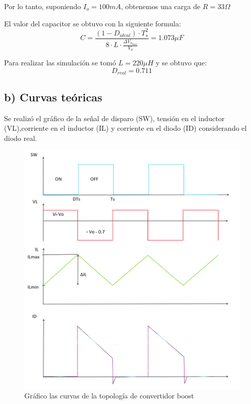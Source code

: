 \documentclass[e4_tp1_main.tex]{subfiles}
\begin{document}


Por lo tanto, suponiendo $I_o=100mA$, obtenemos una carga de $R=33\Omega$



El valor del capacitor se obtuvo con la siguiente formula:
$$C=\frac{(1-D_{ideal}) \cdot T_{s}^{2}}{8\cdot L\cdot \frac{\Delta V_{o_{max}}}{V_o}}=1.073\mu F$$

Para realizar las simulaci\'on se tom\'o  $L=220\mu H$ y se obtuvo que: 
$$D_{real}=0.711$$

\newpage

\subsection*{b) Curvas teóricas}

Se realiz\'o el gr\'afico de la señal de disparo (SW), tensión en el inductor (VL),corriente en el inductor (IL) y corriente en el diodo (ID) considerando el diodo real. 

\begin{figure}[H]
  \centering
    \includegraphics[scale = 0.6]{Imagenes/punto2/Dibujo}
  \caption{Gr\'afico las curvas de la topolog\'ia de convertidor boost}
  \label{fig:dibujo}
\end{figure}
\end{document}

